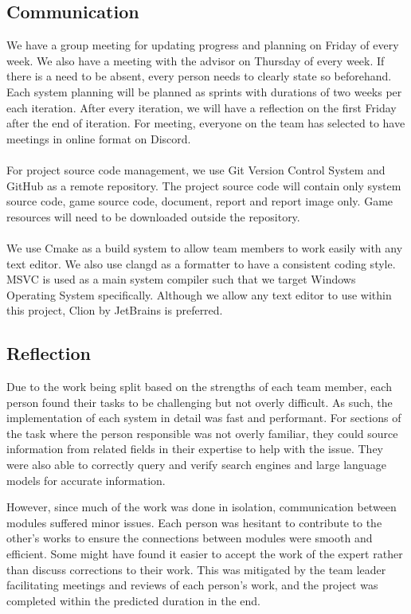 \subsection{Communication}
\label{subsec:collaborative-plan}
We have a group meeting for updating progress and planning on Friday of every week.
We also have a meeting with the advisor on Thursday of every week.
If there is a need to be absent, every person needs to clearly state so beforehand.
Each system planning will be planned as sprints with durations of two weeks per each iteration.
After every iteration, we will have a reflection on the first Friday after the end of iteration.
For meeting, everyone on the team has selected to have meetings in online format on Discord.
\\\\
For project source code management, we use Git Version Control System and GitHub as
a remote repository.
The project source code will contain only system source code, game source code, document, report and report image only.
Game resources will need to be downloaded outside the repository.
\\\\
We use Cmake as a build system to allow team members to work easily with any text editor.
We also use clangd as a formatter to have a consistent coding style.
MSVC is used as a main system compiler such that we target Windows Operating System specifically.
Although we allow any text editor to use within this project, Clion by JetBrains is preferred.

\subsection{Reflection}
\label{subsec:reflection}

Due to the work being split based on the strengths of each team member, each person found their tasks to be challenging
but not overly difficult.
As such, the implementation of each system in detail was fast and performant.
For sections of the task where the person responsible was not overly familiar, they could source information from related fields
in their expertise to help with the issue.
They were also able to correctly query and verify search engines and large language models for accurate information.

However, since much of the work was done in isolation, communication between modules suffered minor issues.
Each person was hesitant to contribute to the other's works to ensure the connections between modules were smooth and efficient.
Some might have found it easier to accept the work of the expert rather than discuss corrections to their work.
This was mitigated by the team leader facilitating meetings and reviews of each person's work, and the project was
completed within the predicted duration in the end.